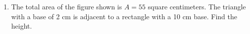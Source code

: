 \begin{enumerate}
\item The total area of the figure shown is $A=55$ square centimeters. The triangle with a base of 2 cm is adjacent to a rectangle with a 10 cm base. Find the height. \par \medskip
  \begin{flushleft}
  \end{flushleft}


\end{enumerate}
